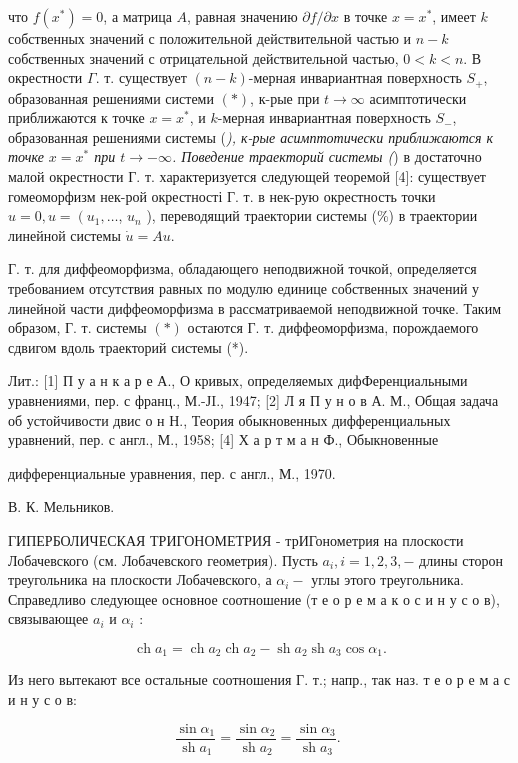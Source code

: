 \documentclass[10pt]{article}
\begin{document}
что $f\left(x^{*}\right)=0$, а матрица $A$, равная значению $\partial f / \partial x$ в точке $x=x^{*}$, имеет $k$ собственных значений с положительной действительной частью и $n-k$ собственных значений с отрицательной действительной частью, $0<k<n$. В окрестности $\Gamma$. т. существует $(n-k)$-мерная инвариантная поверхность $S_{+}$, образованная решениями системи $(*)$, к-рые при $t \rightarrow \infty$ асимптотически приближаются к точке $x=x^{*}$, и $k$-мерная инвариантная поверхность $S_{-}$, образованная решениями системы (\textit{), к-рые асимптотически приближаются к точке $x=x^{*}$ при $t \rightarrow-\infty$. Поведение траекторий системы (}) в достаточно малой окрестности Г. т. характеризуется следующей теоремой [4]: существует гомеоморфизм нек-рой окрестності Г. т. в нек-рую окрестность точки $u=0, u=\left(u_{1}, \ldots\right.$, $u_{n}$ ), переводящий траектории системы (\%) в траектории линейной системы $\dot{u}=A u$.



Г. т. для диффеоморфизма, обладающего неподвижной точкой, определяется требованием отсутствия равных по модулю единице собственных значений у линейной части диффеоморфизма в рассматриваемой неподвижной точке. Таким образом, Г. т. системы $(*)$ остаются Г. т. диффеоморфизма, порождаемого сдвигом вдоль траекторий системы (*).



Лит.: [1] П у а н к а р е А., О кривых, определяемых дифФеренциальными уравнениями, пер. с франц., М.-ЈI., 1947; [2] Л я П у н о в А. М., Общая задача об устойчивости двис о н Н., Теория обыкновенных дифференциальных уравнений, пер. с англ., М., 1958; [4] Х а р т м а н Ф., Обыкновенные

дифференциальные уравнения, пер. с англ., М., 1970.

В. К. Мельников.



ГИПЕРБОЛИЧЕСКАЯ ТРИГОНОМЕТРИЯ - трИГонометрия на плоскости Лобачевского (см. Лобачевского геометрия). Пусть $a_{i}, i=1,2,3,-$ длины сторон треугольника на плоскости Лобачевского, а $\alpha_{i}-$ углы этого треугольника. Справедливо следующее основное соотношение (т е о р е м а к о с и н у с о в), связывающее $a_{i}$ и $\alpha_{i}$ :



\[

\operatorname{ch} a_{1}=\operatorname{ch} a_{2} \operatorname{ch} a_{2}-\operatorname{sh} a_{2} \operatorname{sh} a_{3} \cos \alpha_{1} .

\]



Из него вытекают все остальные соотношения Г. т.; напр., так наз. т е о р е м а с и н у с о в:



\[

\frac{\sin \alpha_{1}}{\operatorname{sh} a_{1}}=\frac{\sin \alpha_{2}}{\operatorname{sh} a_{2}}=\frac{\sin \alpha_{3}}{\operatorname{sh} a_{3}} \text {. }

\]
\end{document}
